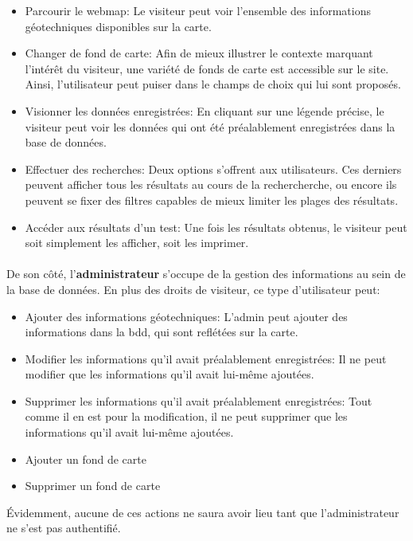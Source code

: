 \begin{itemize}
    \item Parcourir le webmap: Le visiteur peut voir l'ensemble des informations 
    géotechniques disponibles sur la carte.
    \item Changer de fond de carte: Afin de mieux illustrer le contexte marquant 
    l'intérêt du visiteur, une variété de fonds de carte est accessible sur le site. 
    Ainsi, l'utilisateur peut puiser dans le champs de choix qui lui sont proposés.
    \item Visionner les données enregistrées: En cliquant sur une légende précise, 
    le visiteur peut voir les données qui ont été préalablement enregistrées dans la base de données.
    \item Effectuer des recherches: Deux options s'offrent aux utilisateurs. Ces derniers 
    peuvent afficher tous les résultats au cours de la rechercherche, ou encore ils peuvent 
    se fixer des filtres capables de mieux limiter les plages des résultats.
    \item Accéder aux résultats d'un test: Une fois les résultats obtenus, le visiteur 
    peut soit simplement les afficher, soit les imprimer.
\end{itemize}

\paragraph{}
De son côté, l'\textbf{administrateur} s'occupe de la gestion des informations au sein de la base 
de données. En plus des droits de visiteur, ce type d'utilisateur peut:
\begin{itemize}
    \item Ajouter des informations géotechniques: L'admin peut ajouter des informations 
    dans la bdd, qui sont reflétées sur la carte. 
    \item Modifier les informations qu'il avait préalablement enregistrées: Il ne peut 
    modifier que les informations qu'il avait lui-même ajoutées.
    \item Supprimer les informations qu'il avait préalablement enregistrées: Tout comme il 
    en est pour la modification, il ne peut supprimer que les informations qu'il avait lui-même ajoutées.
    \item Ajouter un fond de carte
    \item Supprimer un fond de carte
\end{itemize}

\par 
Évidemment, aucune de ces actions ne saura avoir lieu tant que l'administrateur ne s'est pas authentifié.

